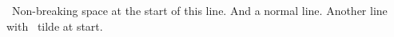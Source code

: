 ~Non-breaking space at the start of this line.
And a normal line.
Another line with ~tilde at start.
